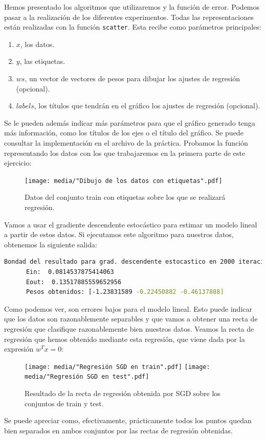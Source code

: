 \documentclass[12pt]{scrartcl}
\begin{document}
{Hemos presentado los algoritmos que utilizaremos y la función de error. Podemos pasar a la realización de los diferentes experimentos. Todas las representaciones están realizadas con la función \lstinline{scatter}. Esta recibe como parámetros principales:
\begin{enumerate}
\item $x$, los datos.
\item $y$, las etiquetas.
\item $ws$, un vector de vectores de pesos para dibujar los ajustes de regresión (opcional).
\item $labels$, los títulos que tendrán en el gráfico los ajustes de regresión (opcional).
\end{enumerate}
Se le pueden además indicar más parámetros para que el gráfico generado tenga más información, como los títulos de los ejes o el título del gráfico. Se puede consultar la implementación en el archivo de la práctica. Probamos la función representando los datos con los 
que trabajaremos en la primera parte de este ejercicio: 
\begin{figure}[H]
  \centering
  \texttt{[image: media/"Dibujo de los datos con etiquetas".pdf]}
  \caption{Datos del conjunto train con etiquetas sobre los que se realizará regresión.}
\end{figure}

Vamos a usar el gradiente descendente estocástico para estimar un modelo lineal a partir de estos datos. 
Si ejecutamos este algoritmo para nuestros datos,  obtenemos la siguiente salida:
\begin{lstlisting}[language=bash]
  Bondad del resultado para grad. descendente estocastico en 2000 iteraciones:
      Ein:  0.0814537875414063
      Eout:  0.13517885559652956
      Pesos obtenidos: [-1.23831589 -0.22450882 -0.46137888]
\end{lstlisting}
Como podemos ver, son errores bajos para el modelo lineal. Esto puede indicar que los datos son razonablemente separables y que vamos a obtener una recta de regresión que clasifique razonablemente bien nuestros datos. 
Veamos la recta de regresión que hemos obtenido mediante esta regresión, que viene dada por la expresión $w^T x = 0$:
\begin{figure}[H]
  \centering
  \texttt{[image: media/"Regresión SGD en train".pdf]}
  \texttt{[image: media/"Regresión SGD en test".pdf]}
  \caption{Resultado de la recta de regresión obtenida por SGD sobre los conjuntos de train y test.}
\end{figure}
Se puede apreciar como, efectivamente, prácticamente todos los puntos quedan bien separados en ambos conjuntos por las rectas de regresión
obtenidas.\\

}
\end{document}
